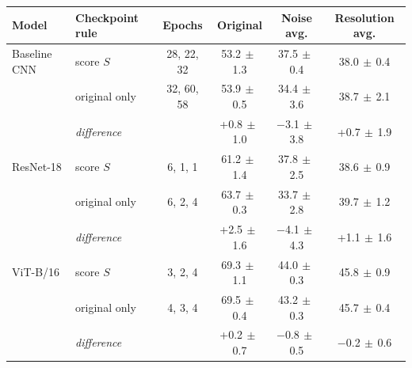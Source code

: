 \begin{tabular}{llcccc}
\toprule
Model & Checkpoint rule & Epochs & Original & Noise avg. & Resolution avg. \\
\midrule
Baseline CNN & score $S$ & 28, 22, 32 & 53.2{\scriptsize$\,\pm\,$1.3} & 37.5{\scriptsize$\,\pm\,$0.4} & 38.0{\scriptsize$\,\pm\,$0.4} \\
 & original only & 32, 60, 58 & 53.9{\scriptsize$\,\pm\,$0.5} & 34.4{\scriptsize$\,\pm\,$3.6} & 38.7{\scriptsize$\,\pm\,$2.1} \\
 & \emph{difference} & & +0.8{\scriptsize$\,\pm\,$1.0} & $-$3.1{\scriptsize$\,\pm\,$3.8} & +0.7{\scriptsize$\,\pm\,$1.9} \\
\addlinespace
ResNet-18 & score $S$ & 6, 1, 1 & 61.2{\scriptsize$\,\pm\,$1.4} & 37.8{\scriptsize$\,\pm\,$2.5} & 38.6{\scriptsize$\,\pm\,$0.9} \\
 & original only & 6, 2, 4 & 63.7{\scriptsize$\,\pm\,$0.3} & 33.7{\scriptsize$\,\pm\,$2.8} & 39.7{\scriptsize$\,\pm\,$1.2} \\
 & \emph{difference} & & +2.5{\scriptsize$\,\pm\,$1.6} & $-$4.1{\scriptsize$\,\pm\,$4.3} & +1.1{\scriptsize$\,\pm\,$1.6} \\
\addlinespace
ViT-B/16 & score $S$ & 3, 2, 4 & 69.3{\scriptsize$\,\pm\,$1.1} & 44.0{\scriptsize$\,\pm\,$0.3} & 45.8{\scriptsize$\,\pm\,$0.9} \\
 & original only & 4, 3, 4 & 69.5{\scriptsize$\,\pm\,$0.4} & 43.2{\scriptsize$\,\pm\,$0.3} & 45.7{\scriptsize$\,\pm\,$0.4} \\
 & \emph{difference} & & +0.2{\scriptsize$\,\pm\,$0.7} & $-$0.8{\scriptsize$\,\pm\,$0.5} & $-$0.2{\scriptsize$\,\pm\,$0.6} \\
\bottomrule
\end{tabular}
